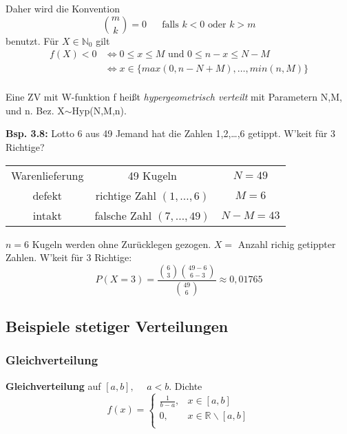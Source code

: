 \documentclass[a4paper,11pt]{article}
\begin{document}
\noindent Daher wird die Konvention
\[\binom{m}{k}=0\hspace{15pt}\text{ falls } k<0 \text{ oder } k>m\]
benutzt.
\newline Für $X\in\mathbb{N}_0$ gilt
\begin{align*}
f(X)<0 &\Leftrightarrow 0\leq x\leq M \text{ und } 0\leq n-x\leq N-M\\
&\Leftrightarrow x\in\{max(0,n-N+M),\dots,min(n,M)\}\\
\end{align*}

\noindent Eine ZV mit W-funktion f heißt \textit{hypergeometrisch verteilt} mit Parametern N,M, und n.
\newline Bez. X$\sim$Hyp(N,M,n).

\vspace{6pt}
\noindent\textbf{Bsp. 3.8:} Lotto 6 aus 49 
\newline Jemand hat die Zahlen 1,2,\dots,6 getippt. W'keit für 3 Richtige?

\vspace{4pt}
 \begin{tabular}{c c c}
    Warenlieferung & 49 Kugeln & $N=49$\\
    defekt & richtige Zahl $(1,\dots,6)$ & $M=6$\\
    intakt & falsche Zahl $(7,\dots,49)$ & $N-M=43$\\
\end{tabular}
\vspace{4pt}
\newline $n=6$ Kugeln werden ohne Zurücklegen gezogen.
\newline $X=$ Anzahl richig getippter Zahlen.
\newline W'keit für 3 Richtige:
\[P(X=3)=\frac{\binom{6}{3}\binom{49-6}{6-3}}{\binom{49}{6}}\approx0,01765\]

\subsection{Beispiele stetiger Verteilungen}

\subsubsection{Gleichverteilung}
\noindent\textbf{Gleichverteilung} auf $[a,b], \hspace{15pt} a<b$.
\newline Dichte
\begin{equation*}
    f(x)=\begin{cases}
    \frac{1}{b-a}, & x\in[a,b]\\
    0, & x\in\mathbb{R}\backslash[a,b]\\
    \end{cases}
\end{equation*}
\end{document}
